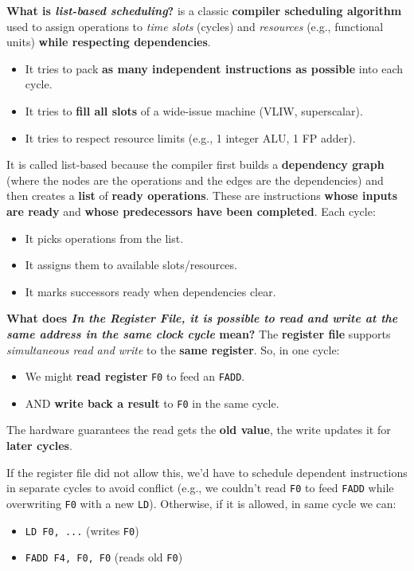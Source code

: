 \begin{enumerate}
    \highspace
    \textcolor{Green3}{ \textbf{What is \emph{list-based scheduling}?}}  is a classic \textbf{compiler scheduling algorithm} used to assign operations to \emph{time slots} (cycles) and \emph{resources} (e.g., functional units) \textbf{while respecting dependencies}.
    \begin{itemize}
        \item It tries to pack \textbf{as many independent instructions as possible} into each cycle.
        \item It tries to \textbf{fill all slots} of a wide-issue machine (VLIW, superscalar).
        \item It tries to respect resource limits (e.g., 1 integer ALU, 1 FP adder).
    \end{itemize}
    It is called list-based because the compiler first builds a \textbf{dependency graph} (where the nodes are the operations and the edges are the dependencies) and then creates a \textbf{list} of \textbf{ready operations}. These are instructions \textbf{whose inputs are ready} and \textbf{whose predecessors have been completed}. Each cycle:
    \begin{itemize}
        \item It picks operations from the list.
        \item It assigns them to available slots/resources.
        \item It marks successors ready when dependencies clear.
    \end{itemize}    
    \textcolor{Red2}{ \textbf{What does \emph{In the Register File, it is possible to read and write at the same address in the same clock cycle} mean?}} The \textbf{register file} supports \emph{simultaneous read and write} to the \textbf{same register}. So, in one cycle:
    \begin{itemize}
        \item We might \textbf{read register} \texttt{F0} to feed an \texttt{FADD}.
        \item AND \textbf{write back a result} to \texttt{F0} in the same cycle.
    \end{itemize}
    The hardware guarantees the read gets the \textbf{old value}, the write updates it for \textbf{later cycles}.
    
    If the register file did not allow this, we'd have to schedule dependent instructions in separate cycles to avoid conflict (e.g., we couldn't read \texttt{F0} to feed \texttt{FADD} while overwriting \texttt{F0} with a new \texttt{LD}). Otherwise, if it is allowed, in same cycle we can:
    \begin{itemize}
        \item \texttt{LD F0, ...} (writes \texttt{F0})
        \item \texttt{FADD F4, F0, F0} (reads old \texttt{F0})
    \end{itemize}


\end{enumerate}
